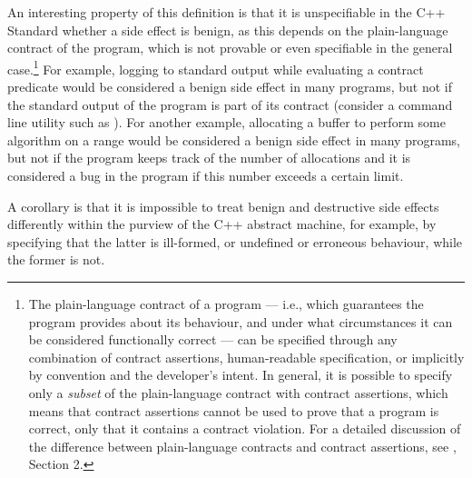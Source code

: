 An interesting property of this definition is that it is unspecifiable in the C++ Standard whether a side effect is benign, as this depends on the plain-language contract of the program, which is not provable or even specifiable in the general case.\footnote{The plain-language contract of a program --- i.e., which guarantees the program provides about its behaviour, and under what circumstances it can be considered functionally correct --- can be specified through any combination of contract assertions, human-readable specification, or implicitly by convention and the developer's intent. In general, it is possible to specify only a \emph{subset} of the plain-language contract with contract assertions, which means that contract assertions cannot be used to prove that a program is correct, only that it contains a contract violation. For a detailed discussion of the difference between plain-language contracts and contract assertions, see \cite{P2900R6}, Section 2.} For example, logging to standard output while evaluating a contract predicate would be considered a benign side effect in many programs, but not if the standard output of the program is part of its contract (consider a command line utility such as ). For another example, allocating a buffer to perform some algorithm on a range would be considered a benign side effect in many programs, but not if the program keeps track of the number of allocations and it is considered a bug in the program if this number exceeds a certain limit.

A corollary is that it is impossible to treat benign and destructive side effects differently within the purview of the C++ abstract machine, for example, by specifying that the latter is ill-formed, or undefined or erroneous behaviour, while the former is not.


